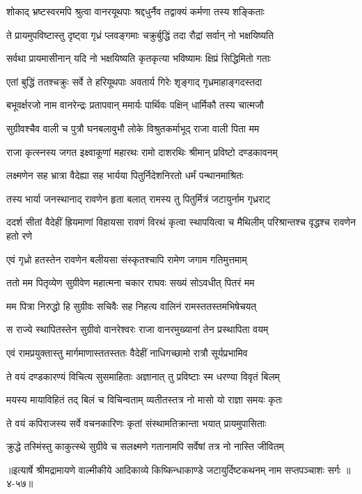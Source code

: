 
\twolineshloka
{शोकाद् भ्रष्टस्वरमपि श्रुत्वा वानरयूथपाः}
{श्रद्दधुर्नैव तद्वाक्यं कर्मणा तस्य शङ्किताः} %

\twolineshloka
{ते प्रायमुपविष्टास्तु दृष्ट्वा गृध्रं प्लवङ्गमाः}
{चक्रुर्बुद्धिं तदा रौद्रां सर्वान् नो भक्षयिष्यति} %

\twolineshloka
{सर्वथा प्रायमासीनान् यदि नो भक्षयिष्यति}
{कृतकृत्या भविष्यामः क्षिप्रं सिद्धिमितो गताः} %

\twolineshloka
{एतां बुद्धिं ततश्चक्रुः सर्वे ते हरियूथपाः}
{अवतार्य गिरेः शृङ्गाद् गृध्रमाहाङ्गदस्तदा} %

\twolineshloka
{बभूवर्क्षरजो नाम वानरेन्द्रः प्रतापवान्}
{ममार्यः पार्थिवः पक्षिन् धार्मिकौ तस्य चात्मजौ} %

\twolineshloka
{सुग्रीवश्चैव वाली च पुत्रौ घनबलावुभौ}
{लोके विश्रुतकर्माभूद् राजा वाली पिता मम} %

\twolineshloka
{राजा कृत्स्नस्य जगत इक्ष्वाकूणां महारथः}
{रामो दाशरथिः श्रीमान् प्रविष्टो दण्डकावनम्} %

\twolineshloka
{लक्ष्मणेन सह भ्रात्रा वैदेह्या सह भार्यया}
{पितुर्निदेशनिरतो धर्मं पन्थानमाश्रितः} %

\twolineshloka
{तस्य भार्या जनस्थानाद् रावणेन हृता बलात्}
{रामस्य तु पितुर्मित्रं जटायुर्नाम गृध्रराट्} %

\threelineshloka
{ददर्श सीतां वैदेहीं ह्रियमाणां विहायसा}
{रावणं विरथं कृत्वा स्थापयित्वा च मैथिलीम्}
{परिश्रान्तश्च वृद्धश्च रावणेन हतो रणे} %

\twolineshloka
{एवं गृध्रो हतस्तेन रावणेन बलीयसा}
{संस्कृतश्चापि रामेण जगाम गतिमुत्तमाम्} %

\twolineshloka
{ततो मम पितृव्येण सुग्रीवेण महात्मना}
{चकार राघवः सख्यं सोऽवधीत् पितरं मम} %

\twolineshloka
{मम पित्रा निरुद्धो हि सुग्रीवः सचिवैः सह}
{निहत्य वालिनं रामस्ततस्तमभिषेचयत्} %

\twolineshloka
{स राज्ये स्थापितस्तेन सुग्रीवो वानरेश्वरः}
{राजा वानरमुख्यानां तेन प्रस्थापिता वयम्} %

\twolineshloka
{एवं रामप्रयुक्तास्तु मार्गमाणास्ततस्ततः}
{वैदेहीं नाधिगच्छामो रात्रौ सूर्यप्रभामिव} %

\twolineshloka
{ते वयं दण्डकारण्यं विचित्य सुसमाहिताः}
{अज्ञानात् तु प्रविष्टाः स्म धरण्या विवृतं बिलम्} %

\twolineshloka
{मयस्य मायाविहितं तद् बिलं च विचिन्वताम्}
{व्यतीतस्तत्र नो मासो यो राज्ञा समयः कृतः} %

\twolineshloka
{ते वयं कपिराजस्य सर्वे वचनकारिणः}
{कृतां संस्थामतिक्रान्ता भयात् प्रायमुपासिताः} %

\twolineshloka
{क्रुद्धे तस्मिंस्तु काकुत्स्थे सुग्रीवे च सलक्ष्मणे}
{गतानामपि सर्वेषां तत्र नो नास्ति जीवितम्} %


॥इत्यार्षे श्रीमद्रामायणे वाल्मीकीये आदिकाव्ये किष्किन्धाकाण्डे जटायुर्दिष्टकथनम् नाम सप्तपञ्चाशः सर्गः ॥४-५७॥
